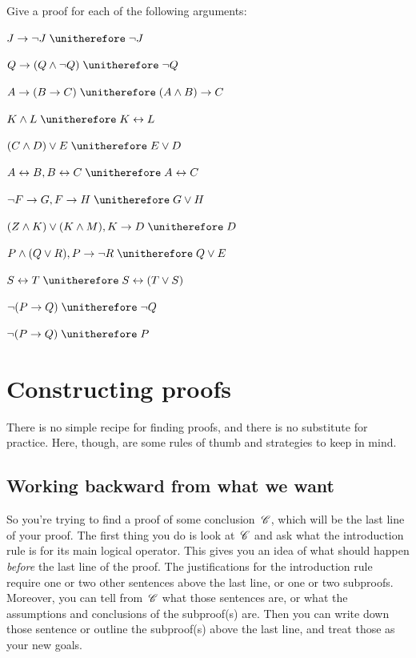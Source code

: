 \solutions
\problempart
\label{pr.solvedTFLproofs}
Give a proof for each of the following arguments:
\begin{compactlist}
\item $J\eif\enot J \therefore \enot J$
\item $Q\eif(Q\eand\enot Q) \therefore \enot Q$
\item $A\eif (B\eif C) \therefore (A\eand B)\eif C$
\item $K\eand L \therefore K\eiff L$
\item $(C\eand D)\eor E \therefore E\eor D$
\item $A\eiff B, B\eiff C \therefore A\eiff C$
\item $\enot F\eif G, F\eif H \therefore G\eor H$
\item $(Z\eand K) \eor (K\eand M), K \eif D \therefore D$
\item $P \eand (Q\eor R), P\eif \enot R \therefore Q\eor E$
\item $S\eiff T \therefore S\eiff (T\eor S)$
\item $\enot (P \eif Q) \therefore \enot Q$
\item $\enot (P \eif Q) \therefore P$
\end{compactlist}


\chapter{Constructing proofs}\label{s:stratTFL}

There is no simple recipe for finding proofs, and there is no substitute for practice. Here, though, are some rules of thumb and strategies to keep in mind.

\section{Working backward from what we want}

So you're trying to find a proof of some conclusion~$\mathscr{C}$, which will be the last line of your proof. The first thing you do is look at~$\mathscr{C}$ and ask what the introduction rule is for its main logical operator. This gives you an idea of what should happen \emph{before} the last line of the proof. The justifications for the introduction rule require one or two other sentences above the last line, or one or two subproofs. Moreover, you can tell from~$\mathscr{C}$ what those sentences are, or what the assumptions and conclusions of the subproof(s) are. Then you can write down those sentence or outline the subproof(s) above the last line, and treat those as your new goals.

